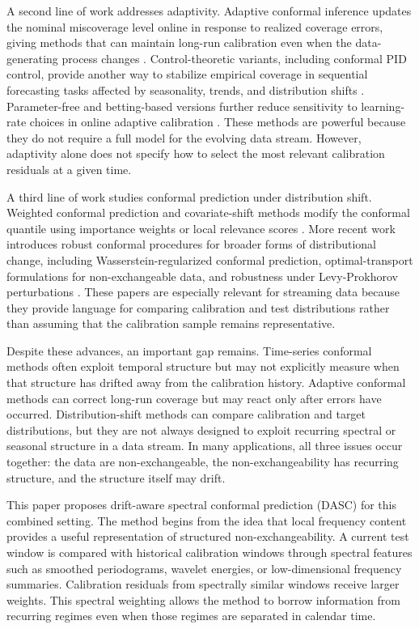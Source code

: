 \documentclass[11pt]{article}
\begin{document}
A second line of work addresses adaptivity. Adaptive conformal inference updates the nominal miscoverage level online in response to realized coverage errors, giving methods that can maintain long-run calibration even when the data-generating process changes \citep{gibbs2021adaptive,zaffran2022adaptive}. Control-theoretic variants, including conformal PID control, provide another way to stabilize empirical coverage in sequential forecasting tasks affected by seasonality, trends, and distribution shifts \citep{angelopoulos2023pid}. Parameter-free and betting-based versions further reduce sensitivity to learning-rate choices in online adaptive calibration \citep{bastani2024betting}. These methods are powerful because they do not require a full model for the evolving data stream. However, adaptivity alone does not specify how to select the most relevant calibration residuals at a given time.

A third line of work studies conformal prediction under distribution shift. Weighted conformal prediction and covariate-shift methods modify the conformal quantile using importance weights or local relevance scores \citep{tibshirani2019conformal}. More recent work introduces robust conformal procedures for broader forms of distributional change, including Wasserstein-regularized conformal prediction, optimal-transport formulations for non-exchangeable data, and robustness under Levy-Prokhorov perturbations \citep{xu2025wasserstein,correia2025optimal,aolaritei2025levy}. These papers are especially relevant for streaming data because they provide language for comparing calibration and test distributions rather than assuming that the calibration sample remains representative.

Despite these advances, an important gap remains. Time-series conformal methods often exploit temporal structure but may not explicitly measure when that structure has drifted away from the calibration history. Adaptive conformal methods can correct long-run coverage but may react only after errors have occurred. Distribution-shift methods can compare calibration and target distributions, but they are not always designed to exploit recurring spectral or seasonal structure in a data stream. In many applications, all three issues occur together: the data are non-exchangeable, the non-exchangeability has recurring structure, and the structure itself may drift.

This paper proposes drift-aware spectral conformal prediction (DASC) for this combined setting. The method begins from the idea that local frequency content provides a useful representation of structured non-exchangeability. A current test window is compared with historical calibration windows through spectral features such as smoothed periodograms, wavelet energies, or low-dimensional frequency summaries. Calibration residuals from spectrally similar windows receive larger weights. This spectral weighting allows the method to borrow information from recurring regimes even when those regimes are separated in calendar time.
\end{document}
